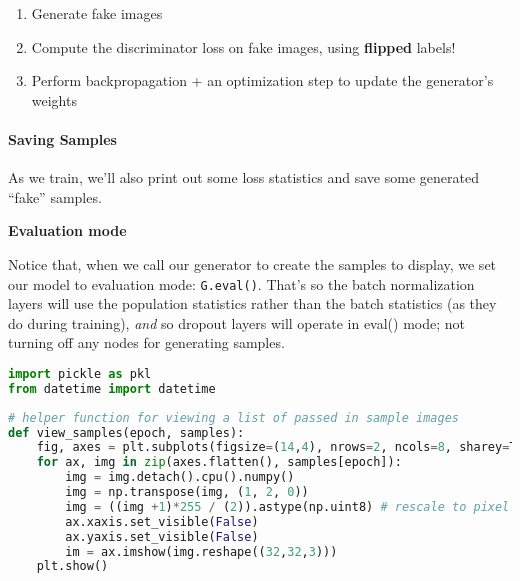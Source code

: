 \begin{enumerate}
\item Generate fake images
\item Compute the discriminator loss on fake images, using \textbf{flipped} labels!
\item Perform backpropagation + an optimization step to update the generator's weights
\end{enumerate}

\paragraph{Saving Samples}

As we train, we'll also print out some loss statistics and save some
generated ``fake'' samples.

\textbf{Evaluation mode}

Notice that, when we call our generator to create the samples to
display, we set our model to evaluation mode:
\lstinline{G.eval()}. That's so the batch normalization
layers will use the population statistics rather than the batch
statistics (as they do during training), \emph{and} so dropout layers
will operate in eval() mode; not turning off any nodes for generating
samples.

\begin{lstlisting}[language=Python]
import pickle as pkl
from datetime import datetime
\end{lstlisting}

\begin{lstlisting}[language=Python]
# helper function for viewing a list of passed in sample images
def view_samples(epoch, samples):
    fig, axes = plt.subplots(figsize=(14,4), nrows=2, ncols=8, sharey=True, sharex=True)
    for ax, img in zip(axes.flatten(), samples[epoch]):
        img = img.detach().cpu().numpy()
        img = np.transpose(img, (1, 2, 0))
        img = ((img +1)*255 / (2)).astype(np.uint8) # rescale to pixel range (0-255)
        ax.xaxis.set_visible(False)
        ax.yaxis.set_visible(False)
        im = ax.imshow(img.reshape((32,32,3)))
    plt.show()
\end{lstlisting}

